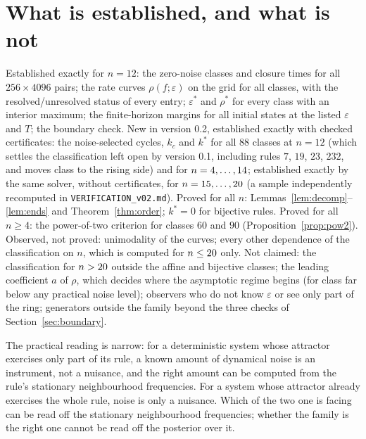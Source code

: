 \documentclass[11pt,a4paper]{article}
\theoremstyle{remark}
\newcommand{\eps}{\varepsilon}
\begin{document}
\section{What is established, and what is not}

Established exactly for $n=12$: the zero-noise classes and closure times for all $256\times4096$ pairs; the rate curves $\rho(f;\eps)$ on the grid for all classes, with the resolved/unresolved status of every entry; $\eps^*$ and $\rho^*$ for every class with an interior maximum; the finite-horizon margins for all initial states at the listed $\eps$ and $T$; the boundary check. New in version 0.2, established exactly with checked certificates: the noise-selected cycles, $k_c$ and $k^*$ for all $88$ classes at $n=12$ (which settles the classification left open by version 0.1, including rules $7$, $19$, $23$, $232$, and moves class \FlipRules{} to the rising side) and for $n=4,\dots,14$; established exactly by the same solver, without certificates, for $n=15,\dots,20$ (a sample independently recomputed in \texttt{VERIFICATION\_v02.md}). Proved for all $n$: Lemmas~\ref{lem:decomp}--\ref{lem:ends} and Theorem~\ref{thm:order}; $k^*=0$ for bijective rules. Proved for all $n\ge4$: the power-of-two criterion for classes $60$ and $90$ (Proposition~\ref{prop:pow2}). Observed, not proved: unimodality of the curves; every other dependence of the classification on $n$, which is computed for $n\le20$ only. Not claimed: the classification for $n>20$ outside the affine and bijective classes; the leading coefficient $a$ of $\rho$, which decides where the asymptotic regime begins (for class \FlipRules{} far below any practical noise level); observers who do not know $\eps$ or see only part of the ring; generators outside the family beyond the three checks of Section~\ref{sec:boundary}.

The practical reading is narrow: for a deterministic system whose attractor exercises only part of its rule, a known amount of dynamical noise is an instrument, not a nuisance, and the right amount can be computed from the rule's stationary neighbourhood frequencies. For a system whose attractor already exercises the whole rule, noise is only a nuisance. Which of the two one is facing can be read off the stationary neighbourhood frequencies; whether the family is the right one cannot be read off the posterior over it.
\end{document}

